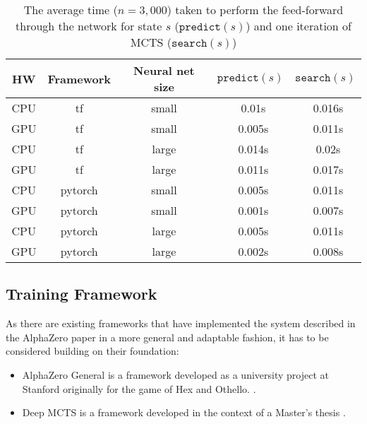 \begin{table*}
    \begin{center}
        \begin{tabular}{ c|c|c|c|c }
            HW  & Framework & Neural net size & $\texttt{predict}(s)$ & $\texttt{search}(s)$ \\
            \hline
            \hline
            CPU & tf        & small           & ~0.01s                & ~0.016s              \\
            GPU & tf        & small           & ~0.005s               & ~0.011s              \\
            CPU & tf        & large           & ~0.014s               & ~0.02s               \\
            GPU & tf        & large           & ~0.011s               & ~0.017s              \\
            CPU & pytorch   & small           & ~0.005s               & ~0.011s              \\
            GPU & pytorch   & small           & ~0.001s               & ~0.007s              \\
            CPU & pytorch   & large           & ~0.005s               & ~0.011s              \\
            GPU & pytorch   & large           & ~0.002s               & ~0.008s              \\
        \end{tabular}
    \end{center}
    \caption{The average time ($n = 3,000$) taken to perform the feed-forward through the network for state $s$ ($\texttt{predict}(s)$) and one iteration of MCTS ($\texttt{search}(s)$)}\label{pytorch_vs_tensorflow_performance}
\end{table*}

\subsection{Training Framework}
As there are existing frameworks that have implemented the system described in the AlphaZero paper in a more general and adaptable fashion, it has to be considered building on their foundation:
\begin{itemize}
    \item AlphaZero General is a framework developed as a university project at Stanford originally for the game of Hex and Othello. \cite{thakoor_learning_nodate,thakoor_suragnairalpha-zero-general_nodate}.
    \item Deep MCTS is a framework developed in the context of a Master's thesis \cite{bruasdal_deep_2020,henribru_deep_2021}.
\end{itemize}

